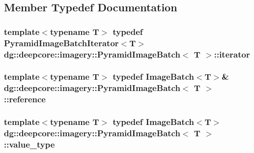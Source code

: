 \subsection{Member Typedef Documentation}
\subsubsection[{\texorpdfstring{iterator}{iterator}}]{\setlength{\rightskip}{0pt plus 5cm}template$<$typename T$>$ typedef {\bf Pyramid\+Image\+Batch\+Iterator}$<$T$>$ {\bf dg\+::deepcore\+::imagery\+::\+Pyramid\+Image\+Batch}$<$ T $>$\+::{\bf iterator}}\hypertarget{classdg_1_1deepcore_1_1imagery_1_1_pyramid_image_batch_a4cad1aac53a144da29324e48ea357f78}{}\label{classdg_1_1deepcore_1_1imagery_1_1_pyramid_image_batch_a4cad1aac53a144da29324e48ea357f78}
\subsubsection[{\texorpdfstring{reference}{reference}}]{\setlength{\rightskip}{0pt plus 5cm}template$<$typename T$>$ typedef {\bf Image\+Batch}$<$T$>$\& {\bf dg\+::deepcore\+::imagery\+::\+Pyramid\+Image\+Batch}$<$ T $>$\+::{\bf reference}}\hypertarget{classdg_1_1deepcore_1_1imagery_1_1_pyramid_image_batch_ac40a046993c4d0ccdc5a44659b130c68}{}\label{classdg_1_1deepcore_1_1imagery_1_1_pyramid_image_batch_ac40a046993c4d0ccdc5a44659b130c68}
\subsubsection[{\texorpdfstring{value\+\_\+type}{value_type}}]{\setlength{\rightskip}{0pt plus 5cm}template$<$typename T$>$ typedef {\bf Image\+Batch}$<$T$>$ {\bf dg\+::deepcore\+::imagery\+::\+Pyramid\+Image\+Batch}$<$ T $>$\+::{\bf value\+\_\+type}}\hypertarget{classdg_1_1deepcore_1_1imagery_1_1_pyramid_image_batch_a64329b050ba9864aec3e3532c7a2aad3}{}\label{classdg_1_1deepcore_1_1imagery_1_1_pyramid_image_batch_a64329b050ba9864aec3e3532c7a2aad3}
